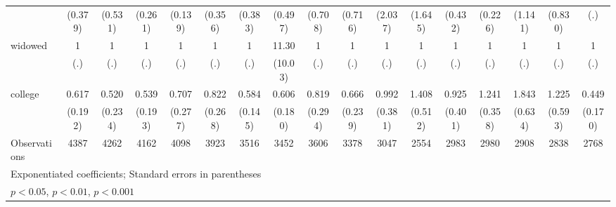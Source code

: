 {\begin{tabular}{l*{16}{c}}
                    &     (0.379)         &     (0.531)         &     (0.261)         &     (0.139)         &     (0.356)         &     (0.383)         &     (0.497)         &     (0.708)         &     (0.716)         &     (2.037)         &     (1.645)         &     (0.432)         &     (0.226)         &     (1.141)         &     (0.830)         &         (.)         \\
[1em]
widowed             &           1         &           1         &           1         &           1         &           1         &           1         &       11.30\sym{**} &           1         &           1         &           1         &           1         &           1         &           1         &           1         &           1         &           1         \\
                    &         (.)         &         (.)         &         (.)         &         (.)         &         (.)         &         (.)         &     (10.03)         &         (.)         &         (.)         &         (.)         &         (.)         &         (.)         &         (.)         &         (.)         &         (.)         &         (.)         \\
[1em]
college             &       0.617         &       0.520         &       0.539         &       0.707         &       0.822         &       0.584\sym{*}  &       0.606         &       0.819         &       0.666         &       0.992         &       1.408         &       0.925         &       1.241         &       1.843         &       1.225         &       0.449\sym{*}  \\
                    &     (0.192)         &     (0.234)         &     (0.193)         &     (0.277)         &     (0.268)         &     (0.145)         &     (0.180)         &     (0.294)         &     (0.239)         &     (0.381)         &     (0.512)         &     (0.401)         &     (0.358)         &     (0.634)         &     (0.593)         &     (0.170)         \\
\hline
Observations        &        4387         &        4262         &        4162         &        4098         &        3923         &        3516         &        3452         &        3606         &        3378         &        3047         &        2554         &        2983         &        2980         &        2908         &        2838         &        2768         \\
\hline\hline
\multicolumn{17}{l}{\footnotesize Exponentiated coefficients; Standard errors in parentheses}\\
\multicolumn{17}{l}{\footnotesize \sym{*} \(p<0.05\), \sym{**} \(p<0.01\), \sym{***} \(p<0.001\)}\\
\end{tabular}
}
